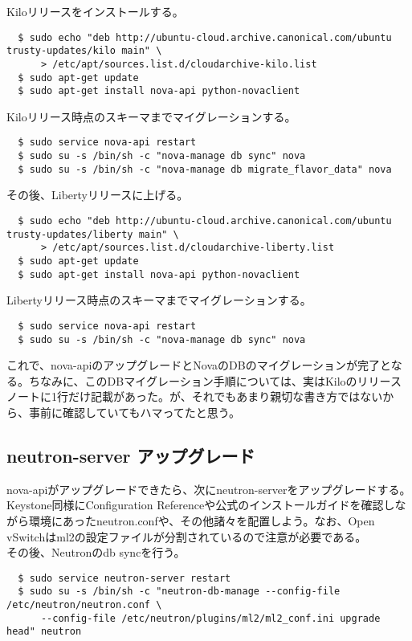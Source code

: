 \documentclass[9pt,b5paper,tombo,openany]{jsbook}
\begin{document}
\noindent
Kiloリリースをインストールする。

\begin{lstlisting}
  $ sudo echo "deb http://ubuntu-cloud.archive.canonical.com/ubuntu trusty-updates/kilo main" \
      > /etc/apt/sources.list.d/cloudarchive-kilo.list
  $ sudo apt-get update
  $ sudo apt-get install nova-api python-novaclient
\end{lstlisting}

\noindent
Kiloリリース時点のスキーマまでマイグレーションする。
\begin{lstlisting}
  $ sudo service nova-api restart
  $ sudo su -s /bin/sh -c "nova-manage db sync" nova
  $ sudo su -s /bin/sh -c "nova-manage db migrate_flavor_data" nova
\end{lstlisting}

\noindent
その後、Libertyリリースに上げる。
\begin{lstlisting}
  $ sudo echo "deb http://ubuntu-cloud.archive.canonical.com/ubuntu trusty-updates/liberty main" \
      > /etc/apt/sources.list.d/cloudarchive-liberty.list
  $ sudo apt-get update
  $ sudo apt-get install nova-api python-novaclient
\end{lstlisting}

\noindent
Libertyリリース時点のスキーマまでマイグレーションする。
\begin{lstlisting}
  $ sudo service nova-api restart
  $ sudo su -s /bin/sh -c "nova-manage db sync" nova
\end{lstlisting}

これで、nova-apiのアップグレードとNovaのDBのマイグレーションが完了となる。ちなみに、このDBマイグレーション手順については、実はKiloのリリースノートに1行だけ記載があった。が、それでもあまり親切な書き方ではないから、事前に確認していてもハマってたと思う。

\subsection{neutron-server アップグレード}
\noindent
nova-apiがアップグレードできたら、次にneutron-serverをアップグレードする。\\[1ex]

Keystone同様にConfiguration Referenceや公式のインストールガイドを確認しながら環境にあったneutron.confや、その他諸々を配置しよう。なお、Open vSwitchはml2の設定ファイルが分割されているので注意が必要である。\\[1ex]

\noindent
その後、Neutronのdb syncを行う。
\begin{lstlisting}
  $ sudo service neutron-server restart
  $ sudo su -s /bin/sh -c "neutron-db-manage --config-file /etc/neutron/neutron.conf \
      --config-file /etc/neutron/plugins/ml2/ml2_conf.ini upgrade head" neutron
\end{lstlisting}
\end{document}
